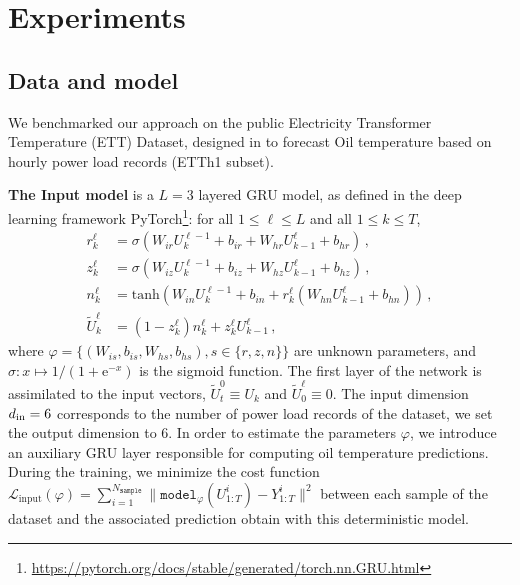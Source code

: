 \documentclass[conference]{IEEEtran}
\begin{document}
\section{Experiments}
\label{sec:exp}
\subsection{Data and model}
\label{sub:data}
We benchmarked our approach on the public Electricity Transformer Temperature (ETT) Dataset, designed in \cite{Zhou2021Informer} to forecast Oil temperature based on hourly power load records (ETTh1 subset).
%

\textbf{The Input model} is a $L=3$ layered GRU model, as defined in the deep learning framework PyTorch\footnote{\href{https://pytorch.org/docs/stable/generated/torch.nn.GRU.html}{https://pytorch.org/docs/stable/generated/torch.nn.GRU.html}}: for all $1 \leq \ell \leq L$ and all $1 \leq k \leq T$,
\begin{align*}
	r^\ell_k        & = \sigma(W_{ir} U^{\ell - 1}_k + b_{ir} + W_{hr} U^{\ell}_{k-1} + b_{hr}) \,,                \\
	z^\ell_k        & = \sigma(W_{iz} U^{\ell - 1}_k + b_{iz} + W_{hz} U^{\ell}_{k-1} + b_{hz}) \,,                \\
	n^\ell_k        & = \mathrm{tanh}(W_{in} U^{\ell - 1}_k + b_{in} + r^\ell_k (W_{hn} U^\ell_{k-1} + b_{hn}))\,, \\
	\tilde U^\ell_k & = (1-z^\ell_k) n^\ell_k+z^\ell_k U^\ell_{k-1}\,,
\end{align*}
where $\varphi = \{(W_{is}, b_{is}, W_{hs}, b_{hs}), s \in \{r, z, n\}\}$ are unknown parameters, and $\sigma: x \mapsto 1/(1+\mathrm{e}^{-x})$ is the sigmoid function.
The first layer of the network is assimilated to the input vectors, $\widetilde U_t^0 \equiv U_k$ and $\widetilde U^\ell_0 \equiv 0$.
The input dimension $d_\textnormal{in}=6$ corresponds to the number of power load records of the dataset, we set the output dimension to 6.
In order to estimate the parameters $\varphi$, we introduce an auxiliary GRU layer responsible for computing oil temperature predictions.
During the training, we minimize the cost function $\mathcal{L}_{\mathrm{input}}(\varphi) = \sum_{i=1}^{N_{\texttt{sample}}} \|\texttt{model}_{\varphi}(U^i_{1:T}) - Y^i_{1:T}\|^2$
between each sample of the dataset and the associated prediction obtain with this deterministic model.
\end{document}
